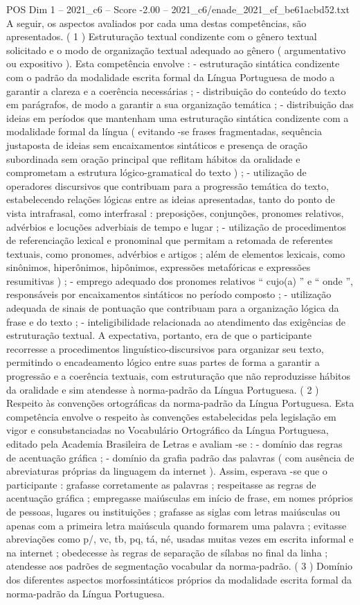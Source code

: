 \begin{textsample}{POS Dim 1 – 2021\_c6 – Score -2.00 – 2021\_c6/enade\_2021\_ef\_be61acbd52.txt}
A seguir, os aspectos avaliados por cada uma destas competências, são apresentados. ( 1 ) Estruturação textual condizente com o gênero textual solicitado e o modo de organização textual adequado ao gênero ( argumentativo ou expositivo ).
Esta competência envolve : - estruturação sintática condizente com o padrão da modalidade escrita formal da Língua Portuguesa de modo a garantir a clareza e a coerência necessárias ; - distribuição do conteúdo do texto em parágrafos, de modo a garantir a sua organização temática ; - distribuição das ideias em períodos que mantenham uma estruturação sintática condizente com a modalidade formal da língua ( evitando -se frases fragmentadas, sequência justaposta de ideias sem encaixamentos sintáticos e presença de oração subordinada sem oração principal que reflitam hábitos da oralidade e comprometam a estrutura lógico-gramatical do texto ) ; - utilização de operadores discursivos que contribuam para a progressão temática do texto, estabelecendo relações lógicas entre as ideias apresentadas, tanto do ponto de vista intrafrasal, como interfrasal : preposições, conjunções, pronomes relativos, advérbios e locuções adverbiais de tempo e lugar ; - utilização de procedimentos de referenciação lexical e pronominal que permitam a retomada de referentes textuais, como pronomes, advérbios e artigos ; além de elementos lexicais, como sinônimos, hiperônimos, hipônimos, expressões metafóricas e expressões resumitivas ) ; - emprego adequado dos pronomes relativos “ cujo(a) ” e “ onde ”, responsáveis por encaixamentos sintáticos no período composto ; - utilização adequada de sinais de pontuação que contribuam para a organização lógica da frase e do texto ; - inteligibilidade relacionada ao atendimento das exigências de estruturação textual.
A expectativa, portanto, era de que o participante recorresse a procedimentos linguístico-discursivos para organizar seu texto, permitindo o encadeamento lógico entre suas partes de forma a garantir a progressão e a coerência textuais, com estruturação que não reproduzisse hábitos da oralidade e sim atendesse à norma-padrão da Língua Portuguesa. ( 2 ) Respeito às convenções ortográficas da norma-padrão da Língua Portuguesa.
Esta competência envolve o respeito às convenções estabelecidas pela legislação em vigor e consubstanciadas no Vocabulário Ortográfico da Língua Portuguesa, editado pela Academia Brasileira de Letras e avaliam -se : - domínio das regras de acentuação gráfica ; - domínio da grafia padrão das palavras ( com ausência de abreviaturas próprias da linguagem da internet ).
Assim, esperava -se que o participante : grafasse corretamente as palavras ; respeitasse as regras de acentuação gráfica ; empregasse maiúsculas em início de frase, em nomes próprios de pessoas, lugares ou instituições ; grafasse as siglas com letras maiúsculas ou apenas com a primeira letra maiúscula quando formarem uma palavra ; evitasse abreviações como p/, vc, tb, pq, tá, né, usadas muitas vezes em escrita informal e na internet ; obedecesse às regras de separação de sílabas no final da linha ; atendesse aos padrões de segmentação vocabular da norma-padrão. ( 3 ) Domínio dos diferentes aspectos morfossintáticos próprios da modalidade escrita formal da norma-padrão da Língua Portuguesa.

\end{textsample}
